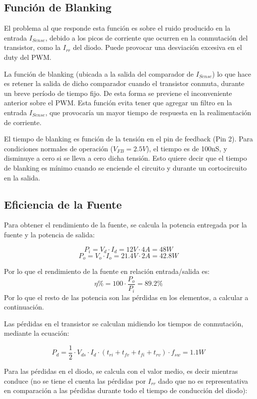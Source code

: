 \documentclass[e4_tp2_main.tex]{subfiles}
\begin{document}
\subsection*{Función de Blanking}

El problema al que responde esta función es sobre el ruido producido en la entrada $I_{Sense}$, debido a los picos de corriente que ocurren en la conmutación del transistor, como la $I_{rr}$ del diodo. Puede provocar una desviación excesiva en el duty del PWM.\par
La función de blanking (ubicada a la salida del comparador de $I_{Sense}$) lo que hace es retener la salida de dicho comparador cuando el transistor conmuta, durante un breve período de tiempo fijo. De esta forma se previene el inconveniente anterior sobre el PWM. Esta función evita tener que agregar un filtro en la entrada $I_{Sense}$, que provocaría un mayor tiempo de respuesta en la realimentación de corriente.\par
El tiempo de blanking es función de la tensión en el pin de feedback (Pin 2). Para condiciones normales de operación ($V_{FB} = 2.5V$), el tiempo es de 100nS, y disminuye a cero si se lleva a cero dicha tensión. Esto quiere decir que el tiempo de blanking es mínimo cuando se enciende el circuito y durante un cortocircuito en la salida. 

\newpage

\subsection*{Eficiencia de la Fuente}
Para obtener el rendimiento de la fuente, se calcula la potencia entregada por la fuente y la potencia de salida:

\[
P_i = V_d \cdot I_d = 12V \cdot 4A = 48W  
\]
\[
P_o = V_o \cdot I_o = 21.4V \cdot 2A = 42.8W
\]

Por lo que el rendimiento de la fuente en relación entrada/salida es:
\[
\eta \% = 100 \cdot \frac{P_o}{P_i} = 89.2 \%
\]
Por lo que el resto de las potencia son las pérdidas en los elementos, a calcular a continuación.\par

Las pérdidas en el transistor se calculan midiendo los tiempos de conmutación, mediante la ecuación:

\[
P_d = \frac{1}{2} \cdot V_{ds} \cdot I_d \cdot (t_{ri} + t_{fv} + t_{fi} + t_{rv}) \cdot f_{sw} = 1.1W
\]

Para las pérdidas en el diodo, se calcula con el valor medio, es decir mientras conduce (no se tiene el cuenta las pérdidas por $I_{rr}$ dado que no es representativa en comparación a las pérdidas durante todo el tiempo de conducción del diodo):
\end{document}
